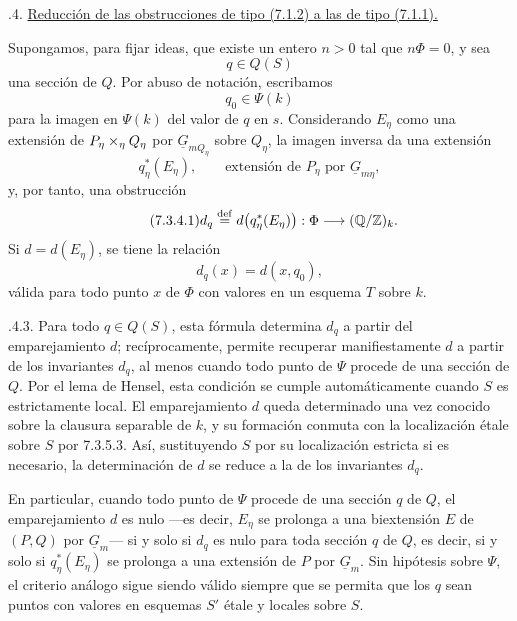 
\medskip
{}.4. \underline{Reducción de las obstrucciones de tipo
(7.1.2) a las de tipo (7.1.1).}

Supongamos, para fijar ideas, que existe un entero $n>0$ tal que
$n\Phi=0$, y sea
\[
 q\in Q(S)
\]
una sección de $Q$. Por abuso de notación, escribamos
\[
 q_0\in\Psi(k)
\]
para la imagen en $\Psi(k)$ del valor de $q$ en $s$. Considerando
$E_\eta$ como una extensión de
$\sisi{P_{\eta Q_\eta}}{P_\eta\times_\eta Q_\eta}$ por
$\underline G_{mQ_\eta}$ sobre $Q_\eta$, la imagen inversa da una
extensión
\[
 q_\eta^*(E_\eta),\qquad
 \text{extensión de $P_\eta$ por $\underline G_{m\eta}$},
\]
y, por tanto, una obstrucción
\begin{equation}\tag{7.3.4.1}
 d_q\overset{\mathrm{def}}{=}
 d\bigl(q_\eta^*(E_{\sisi{*}{\eta}})\bigr):
 \Phi\longrightarrow(\mathbb Q/\mathbb Z)_k.
\end{equation}
Si $d=d(E_\eta)$, se tiene la relación
\begin{equation}\tag{7.3.4.2}
 d_q(x)=d(x,q_0),
\end{equation}
válida para todo punto $x$ de $\Phi$ con valores en un esquema $T$
sobre $k$.

\smallskip
{}.4.3. Para todo $q\in Q(S)$, esta fórmula determina $d_q$
a partir del emparejamiento $d$; recíprocamente, permite recuperar
manifiestamente $d$ a partir de los invariantes $d_q$, al menos cuando
todo punto de $\Psi$ procede de una sección de $Q$. Por el lema de
Hensel, esta condición se cumple automáticamente cuando $S$ es
estrictamente local. El emparejamiento $d$ queda determinado una vez
conocido sobre la clausura separable de $k$, y su formación conmuta con
la localización étale sobre $S$ por 7.3.5.3. Así, sustituyendo $S$ por
su localización estricta si es necesario, la determinación de $d$ se
reduce a la de los invariantes $d_q$.

En particular, cuando todo punto de $\Psi$ procede de una sección $q$
de $Q$, el emparejamiento $d$ es nulo —es decir, $E_\eta$ se prolonga
a una biextensión $E$ de $(P,Q)$ por $\underline G_m$— si y solo si
$d_q$ es nulo para toda sección $q$ de $Q$, es decir, si y solo si
$q_\eta^*(E_\eta)$ se prolonga a una extensión de $P$ por
$\underline G_m$. Sin hipótesis sobre $\Psi$, el criterio análogo
sigue siendo válido siempre que se permita que los $q$ sean puntos con
valores en esquemas $S'$ étale y locales sobre $S$.


